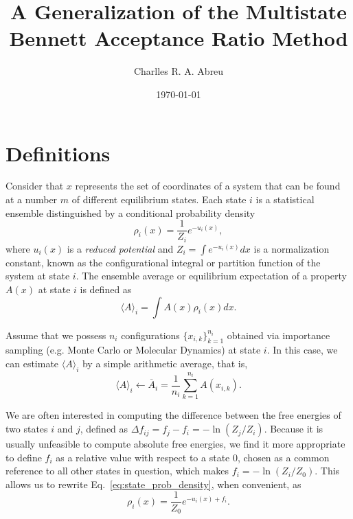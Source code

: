 \documentclass[aip,jcp,reprint,amsmath,amssymb]{revtex4-1}
\begin{document}
\title{A Generalization of the Multistate Bennett Acceptance Ratio Method}

\author{Charlles R. A. Abreu}

\date{\today}

\maketitle

\section{Definitions}
\label{sec:definitions}

Consider that $x$ represents the set of coordinates of a system that can be found at a number $m$ of different equilibrium states. Each state $i$ is a statistical ensemble distinguished by a conditional probability density
\begin{equation}
\label{eq:state_prob_density}
\rho_i(x) = \frac{1}{Z_i} e^{-u_i(x)},
\end{equation}
where $u_i(x)$ is a \textit{reduced potential}\cite{Shirts_2008, Chodera_2011} and $Z_i = \int e^{-u_i(x)}dx$ is a normalization constant, known as the configurational integral or partition function of the system at state $i$. The ensemble average or equilibrium expectation of a property $A(x)$ at state $i$ is defined as
\begin{equation}
\label{eq:ensemble-average}
\langle A \rangle_i = \int A(x)\rho_i(x)dx.
\end{equation}

Assume that we possess $n_i$ configurations $\{x_{i,k}\}_{k=1}^{n_i}$ obtained via importance sampling (e.g. Monte Carlo or Molecular Dynamics)\cite{Allen_1987} at state $i$. In this case, we can estimate $\langle A \rangle_i$ by a simple arithmetic average, that is,
\begin{equation}
\label{eq:average_estimator}
\langle A \rangle_i \leftarrow \overline A_i = \frac{1}{n_i} \sum_{k=1}^{n_i} A(x_{i,k}).
\end{equation}

We are often interested in computing the difference between the free energies of two states $i$ and $j$, defined as $\Delta f_{ij} = f_j - f_i = - \ln (Z_j/Z_i)$. Because it is usually unfeasible to compute absolute free energies, we find it more appropriate to define $f_i$ as a relative value with respect to a state $0$, chosen as a common reference to all other states in question, which makes $f_i = -\ln (Z_i/Z_0)$. This allows us to rewrite Eq.~\eqref{eq:state_prob_density}, when convenient, as
\begin{equation}
\label{eq:state_prob_density_Z0}
\rho_i(x) = \frac{1}{Z_0} e^{-u_i(x)+ f_i}.
\end{equation}
\end{document}
